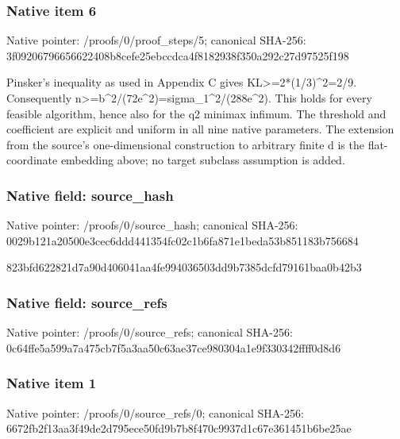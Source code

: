 \documentclass[10pt,a4paper]{article}
\begin{document}
\subsubsection{Native item 6}
Native pointer: /proofs/0/proof\_\allowbreak{}steps/5; canonical SHA-256: 3f09206796656622408b8cefe25ebccdca4f8182938f350a292c27d97525f198

\begingroup\raggedright\sloppy Pinsker's inequality as used in Appendix C gives KL>=\allowbreak{}2*(1/\allowbreak{}3)\textasciicircum{}2=\allowbreak{}2/\allowbreak{}9. Consequently n>=\allowbreak{}b\textasciicircum{}2/\allowbreak{}(72e\textasciicircum{}2)=\allowbreak{}sigma\_\allowbreak{}1\textasciicircum{}2/\allowbreak{}(288e\textasciicircum{}2). This holds for every feasible algorithm,\allowbreak{} hence also for the q2 minimax infimum. The threshold and coefficient are explicit and uniform in all nine native parameters. The extension from the source's one-dimensional construction to arbitrary finite d is the flat-coordinate embedding above;\allowbreak{} no target subclass assumption is added.\par\endgroup

\subsubsection{Native field: source\_\allowbreak{}hash}
Native pointer: /proofs/0/source\_\allowbreak{}hash; canonical SHA-256: 0029b121a20500e3cec6ddd441354fc02c1b6fa871e1beda53b851183b756684

\begingroup\raggedright\sloppy 823bfd622821d7a90d406041aa4fe994036503dd9b7385dcfd79161baa0b42b3\par\endgroup

\subsubsection{Native field: source\_\allowbreak{}refs}
Native pointer: /proofs/0/source\_\allowbreak{}refs; canonical SHA-256: 0c64ffe5a599a7a475cb7f5a3aa50c63ae37ce980304a1e9f330342ffff0d8d6

\subsubsection{Native item 1}
Native pointer: /proofs/0/source\_\allowbreak{}refs/0; canonical SHA-256: 6672fb2f13aa3f49de2d795ece50fd9b7b8f470c9937d1c67e361451b6be25ae
\end{document}
